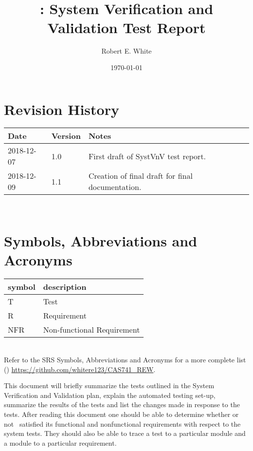 \documentclass[12pt, titlepage]{article}
\begin{document}
\title{\progname: System Verification and Validation Test Report} 
\author{Robert E. White}
\date{\today}
	
\maketitle


\section{Revision History}

\begin{tabularx}{\textwidth}{p{3cm}p{2cm}X}
\toprule {\bf Date} & {\bf Version} & {\bf Notes}\\
\midrule
2018-12-07 & 1.0 & First draft of SystVnV test report.\\
2018-12-09 & 1.1 & Creation of final draft for final documentation. \\
\bottomrule
\end{tabularx}

~\newpage

\section{Symbols, Abbreviations and Acronyms}

\renewcommand{\arraystretch}{1.2}
\begin{tabular}{l l} 
	\toprule		
	\textbf{symbol} & \textbf{description}\\
	\midrule 
	T & Test\\
	R & Requirement\\ 
	NFR & Non-functional Requirement\\
	\bottomrule
\end{tabular}\\

Refer to the SRS Symbols, Abbreviations and Acronyms for a more 
complete list (\cite{SRS}) \url{https://github.com/whitere123/CAS741_REW}. 

\newpage

\tableofcontents

\listoftables %

\listoffigures %

\newpage


This document will briefly summarize the tests outlined in the System 
Verification and Validation plan, explain the automated testing set-up, 
summarize the results of the tests and list the changes made in response to the 
tests. After reading this document one should be able to determine whether or 
not \progname \ satisfied its functional and nonfunctional requirements with 
respect to the system tests. They 
should also be able to trace a test to a particular module and a module to a 
particular requirement. 
\end{document}
